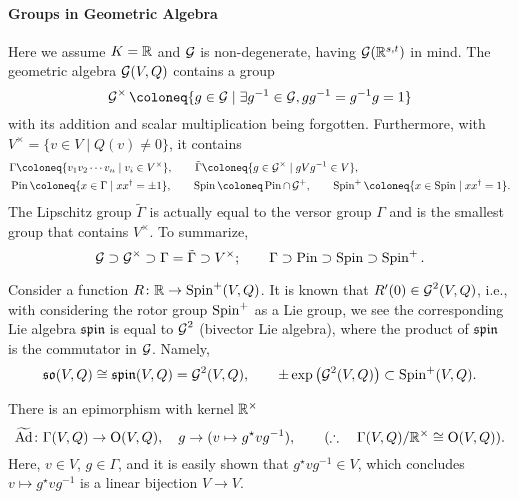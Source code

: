 \documentclass[CheatSheet]{subfiles}
\begin{document}
\paragraph{Groups in Geometric Algebra}
Here we assume $K={\mathbb{R}}$ and $\operatorname{\mathcal{G}}$ is non-degenerate, having $\operatorname{\mathcal{G}}({\mathbb{R}}^{s,t})$ in mind.
The geometric algebra $\operatorname{\mathcal{G}}(V,Q)$ contains a group
\begin{equation}
\GeoA^\times \deq \{g\in\GeoA\mid \exists g^{-1}\in\GeoA, gg^{-1}=g^{-1}g=1\}
\end{equation}
with its addition and scalar multiplication being forgotten.
Furthermore, with $V^\times=\{v\in V\mid Q(v)\neq 0\}$, it contains
\begin{align}
  &
  \Gamma\deq\{v_1v_2\cdots v_n\mid v_i\in V^\times\},
  \qquad \tilde \Gamma\deq \{g\in\GeoA^\times\mid gVg^{-1}\in V\},
\notag\\
  &\Pin\deq\{x\in \Gamma\mid xx^\dagger = \pm1\},
 \qquad\Spin\deq \Pin\cap\GeoA^+,
 \qquad\Spin^+\deq \{x\in\Spin\mid xx^\dagger=1\}.
\end{align}
The Lipschitz group $\tilde\Gamma$ is actually equal to the versor group $\Gamma$ and is the smallest group that contains $V^\times$. To summarize,
\[\operatorname{\mathcal{G}}\supset\operatorname{\mathcal{G}}^\times\supset \Gamma=\tilde\Gamma\supset V^\times;\qquad\Gamma\supset\operatorname{\mathrm{Pin}}\supset\operatorname{\mathrm{Spin}}\supset\operatorname{\mathrm{Spin}}^+.\]

Consider a function $R\colon {\mathbb{R}}\to\operatorname{\mathrm{Spin}}^+(V,Q)$. It is known that $R'(0)\in\operatorname{\mathcal{G}}^2(V,Q)$, i.e., with considering the rotor group $\operatorname{\mathrm{Spin}}^+$ as a Lie group, we see the corresponding Lie algebra $\mathfrak{spin}$ is equal to $\operatorname{\mathcal{G}}^2$ (bivector Lie algebra), where the product of $\mathfrak{spin}$ is the commutator in $\operatorname{\mathcal{G}}$.
Namely,
\begin{equation}
\operatorname{\mathfrak{so}}(V,Q)\cong\mathfrak{spin}(V,Q)=\operatorname{\mathcal{G}}^2(V,Q),\qquad
\pm\exp\left(\operatorname{\mathcal{G}}^2(V,Q)\right)\subset\operatorname{\mathrm{Spin}}^+(V,Q).
\end{equation}


There is an epimorphism with kernel ${\mathbb{R}}^\times$
\begin{equation}
\operatorname{\widetilde{\mathrm{Ad}}}\colon \Gamma(V,Q)\to\operatorname{\mathrm O}(V,Q),\quad g\to (v\mapsto g^\star v g^{-1}),\qquad(\therefore\quad \Gamma(V,Q)/{\mathbb{R}}^\times\cong\operatorname{\mathrm O}(V,Q)).
\end{equation}
Here, $v\in V$, $g\in \Gamma$, and it is easily shown that $g^\star v g^{-1}\in V$, which concludes $v\mapsto g^\star v g^{-1}$ is a linear bijection $V\to V$.

\medskip
\end{document}
